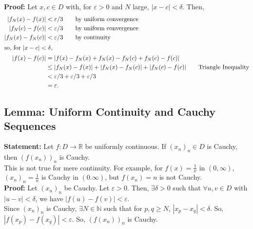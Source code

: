 \documentclass[10pt]{extarticle}
\newcommand{\N}{\mathbb{N}}
\newcommand{\R}{\mathbb{R}}
\begin{document}
  \textbf{Proof:} Let $x,c\in D$ with, for $\varepsilon > 0$ and $N$ large, $|x-c| < \delta$. Then,
  \begin{align*}
    |f_N(x)-f(x)| &< \varepsilon/3 \tag*{by uniform convergence}\\
    |f_N(c)-f(c)| &< \varepsilon/3 \tag*{by uniform convergence}\\
    |f_N(x)-f_N(c)| &< \varepsilon/3 \tag*{by continuity}\\
    \shortintertext{so, for $|x-c| < \delta$,}
    |f(x)-f(c)| &= |f(x)-f_N(x)+f_N(x)-f_N(c) + f_N(c)-f(c)|\\
                &\leq |f_N(x)-f(x)| + |f_N(x)-f_N(c)| + |f_N(c)-f(c)|\tag*{Triangle Inequality}\\
                &< \varepsilon/3 + \varepsilon/3 + \varepsilon/3\\
                &= \varepsilon.
  \end{align*}
  \subsection{Lemma: Uniform Continuity and Cauchy Sequences}%
    \textbf{Statement:} Let $f: D\rightarrow \R$ be uniformly continuous. If $(x_n)_n\in D$ is Cauchy, then $\left(f(x_n)\right)_n$ is Cauchy.\\

    This is not true for mere continuity. For example, for  $f(x) = \frac{1}{x}$ in $(0,\infty)$, $(x_n)_n = \frac{1}{n}$ is Cauchy in $(0.\infty)$, but $f(x_n) = n$ is not Cauchy.\\

    \textbf{Proof:} Let $(x_n)_n$ be Cauchy. Let $\varepsilon > 0$. Then, $\exists \delta > 0$ such that $\forall u,v\in D$ with $|u-v| < \delta$, we have $|f(u) - f(v)| < \varepsilon$.\\

    Since $(x_n)_n$ is Cauchy, $\exists N\in \N$ such that for $p,q \geq N$, $|x_p - x_q| < \delta$. So, $|f(x_p) - f(x_q)| < \varepsilon$. So, $\left(f(x_n)\right)_n$ is Cauchy.
\end{document}
